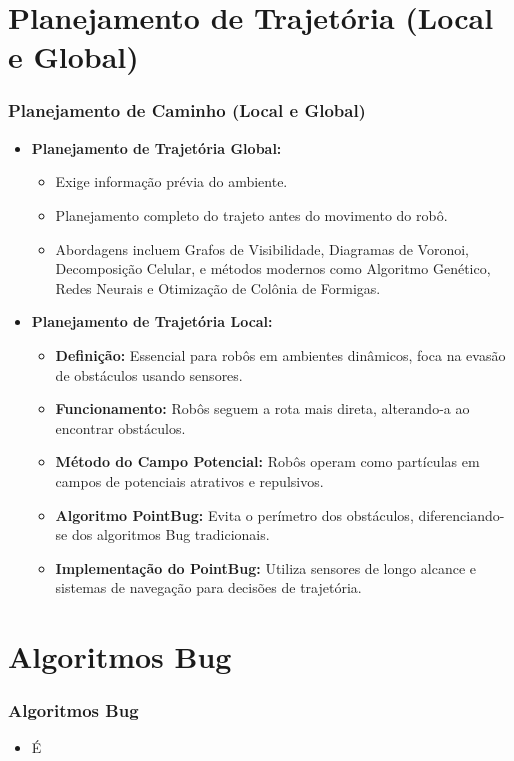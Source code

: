 \documentclass[xcolor=dvipsnames, aspectratio=169]{beamer}
\begin{document}
\section{Planejamento de Trajetória (Local e Global)}
\begin{frame}
  \frametitle{Planejamento de Caminho (Local e Global)}
  \begin{itemize}
    \item \textbf{Planejamento de Trajetória Global:} 
    \begin{itemize}
        \item Exige informação prévia do ambiente.
        \item Planejamento completo do trajeto antes do movimento do robô.
        \item Abordagens incluem Grafos de Visibilidade, Diagramas de Voronoi, Decomposição Celular, e métodos modernos como Algoritmo Genético, Redes Neurais e Otimização de Colônia de Formigas.
    \end{itemize}
    \item \textbf{Planejamento de Trajetória Local:}
    \begin{itemize}
      \item \textbf{Definição:} Essencial para robôs em ambientes dinâmicos, foca na evasão de obstáculos usando sensores.
      \item \textbf{Funcionamento:} Robôs seguem a rota mais direta, alterando-a ao encontrar obstáculos.
      \item \textbf{Método do Campo Potencial:} Robôs operam como partículas em campos de potenciais atrativos e repulsivos.
      \item \textbf{Algoritmo PointBug:} Evita o perímetro dos obstáculos, diferenciando-se dos algoritmos Bug tradicionais.
      \item \textbf{Implementação do PointBug:} Utiliza sensores de longo alcance e sistemas de navegação para decisões de trajetória.
  \end{itemize}
\end{itemize}
\end{frame}

\section{Algoritmos Bug}
\begin{frame}
  \frametitle{Algoritmos Bug}
  \begin{itemize}
    \item É
  \end{itemize}
\end{frame}
\end{document}
